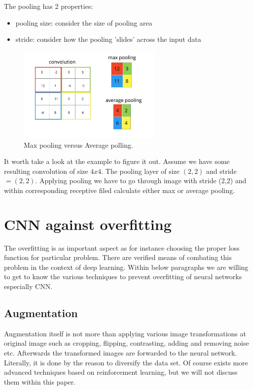The pooling has 2 properties:
\begin{itemize}
    \item pooling size: consider the size of pooling area 
    \item stride: consider how the pooling 'slides' across the input data 
\end{itemize}    

\begin{figure}[h]
    \centering \includegraphics[width=7cm]{images/pooling.jpg}
    \caption {Max pooling versus Average polling.}
\end{figure}

It worth take a look at the example to figure it out. Assume we have some resulting convolution of size $4x4$. The pooling layer of size $(2, 2)$ and stride $ = (2, 2)$. 
Applying pooling we have to go through image with stride (2,2) and within corresponding receptive filed calculate either max or average pooling.  

\section{CNN against overfitting}
The overfitting is as important aspect as for instance choosing the proper loss function for particular problem. There are verified means of combating this problem in the context of deep learning. Within below paragraphs we are willing to get to know the various techniques to prevent overfitting of neural networks especially CNN. 

\subsection{Augmentation}
Augmentation itself is not more than applying various image transformations at original image such as cropping, flipping, contrasting, adding and removing noise etc. Afterwards the transformed images are forwarded to the neural network. Literally, it is done by the reason to diversify the data set. Of course exists more advanced techniques based on reinforcement learning, but we will not discuss them within this paper.      


